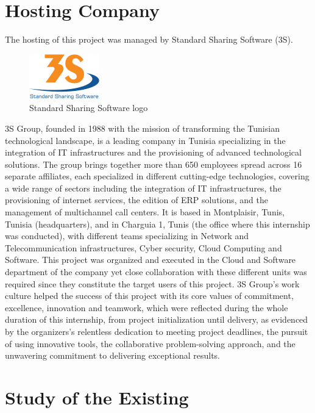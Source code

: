 \section{Hosting Company}
The hosting of this project was managed by Standard Sharing Software (3S).\smallskip
\begin{figure}[H]
    \centering
    \includegraphics[width=0.4\linewidth]{./figures/logo_3S.png}
    \caption{Standard Sharing Software logo}
\end{figure}
3S Group, founded in 1988 with the mission of transforming the Tunisian technological landscape, is a leading company in Tunisia specializing in the integration of IT infrastructures and the provisioning of advanced technological solutions. The group brings together more than 650 employees spread across 16 separate affiliates, each specialized in different cutting-edge technologies, covering a wide range of sectors including the integration of IT infrastructures, the provisioning of internet services, the edition of ERP solutions, and the management of multichannel call centers.\newline
It is based in Montplaisir, Tunis, Tunisia (headquarters), and in Charguia 1, Tunis (the office where this internship was conducted), with different teams specializing in Network and Telecommunication infrastructures, Cyber security, Cloud Computing and Software. This project was organized and executed in the Cloud and Software department of the company yet close collaboration with these different units was required since they constitute the target users of this project.\newline
3S Group's work culture helped the success of this project with its core values of commitment, excellence, innovation and teamwork, which were reflected during the whole duration of this internship, from project initialization until delivery, as evidenced by the organizers's relentless dedication to meeting project deadlines, the pursuit of using innovative tools, the collaborative problem-solving approach, and the unwavering commitment to delivering exceptional results.

\section{Study of the Existing}
